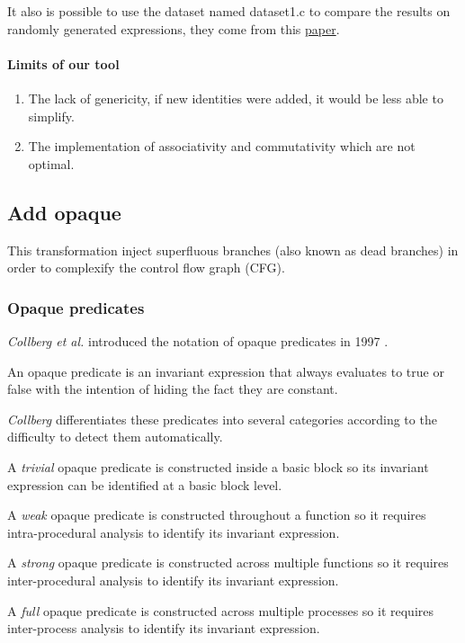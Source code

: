 \documentclass{projectreport}
\begin{document}
It also is possible to use the dataset named dataset1.c to compare the results on randomly generated expressions, they come from this \href{https://github.com/werew/qsynth-artifacts/blob/master/datasets/custom_EA_ED/original.c}{paper}.

\paragraph{Limits of our tool}

\begin{enumerate}
    \item The lack of genericity, if new identities were added, it would be less able to simplify.
    \item The implementation of associativity and commutativity which are not optimal.
\end{enumerate}

\subsection{Add opaque}

This transformation inject superfluous branches (also known as dead branches) in order to complexify the control flow graph (\textsf{CFG}).

\subsubsection{Opaque predicates}

\textit{Collberg et al.} introduced the notation of opaque predicates in 1997 \cite{collberg}.

\begin{definition} An opaque predicate is an invariant expression that
always evaluates to true or false with the intention of hiding the fact they are constant.
\end{definition}
\textit{Collberg} differentiates these predicates into several categories according to the difficulty to detect them automatically.

\begin{description}[font=\sffamily\bfseries, leftmargin=1cm, style=nextline]
  \item[Trivial]
    A \textit{trivial} opaque predicate is constructed inside a basic block so its invariant expression can be identified at a basic block level.
  \item[Weak]
    A \textit{weak} opaque predicate is constructed throughout a function so it requires intra-procedural analysis to identify its invariant
expression.
  \item[Strong]
    A \textit{strong} opaque predicate is constructed across multiple functions so it requires inter-procedural analysis to identify its invariant expression.
  \item[Full]
  A \textit{full} opaque predicate is constructed across multiple processes so it requires inter-process analysis to identify its invariant expression.
\end{description}
\end{document}
